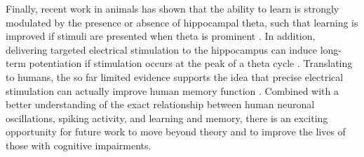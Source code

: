 Finally, recent work in animals has shown that the ability to learn is strongly modulated by the presence or absence of hippocampal theta, such that learning is improved if stimuli are presented when theta is prominent \citep{SeagEtal02}. In addition, delivering targeted electrical stimulation to the hippocampus can induce long-term potentiation if stimulation occurs at the peak of a theta cycle \citep{HymaEtal03,McCaEtal04}. Translating to humans, the so far limited evidence supports the idea that precise electrical stimulation can actually improve human memory function \citep{SuthEtal12}. Combined with a better understanding of the exact relationship between human neuronal oscillations, spiking activity, and learning and memory, there is an exciting opportunity for future work to move beyond theory and to improve the lives of those with cognitive impairments.















